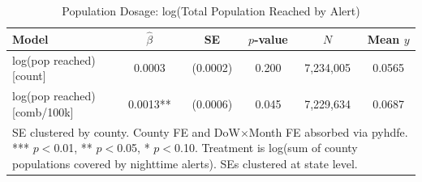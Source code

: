 \begin{table}[htbp]\centering
\caption{Population Dosage: log(Total Population Reached by Alert)}
\begin{tabular}{lccccc}
\hline\hline
Model & $\hat\beta$ & SE & $p$-value & $N$ & Mean $y$ \\
\midrule
log(pop reached) [count] & 0.0003 & (0.0002) & 0.200 & 7,234,005 & 0.0565 \\
log(pop reached) [comb/100k] & 0.0013** & (0.0006) & 0.045 & 7,229,634 & 0.0687 \\
\hline\hline
\multicolumn{6}{p{0.9\textwidth}}{\footnotesize SE clustered by county. County FE and DoW$\times$Month FE absorbed via pyhdfe. *** $p{<}$0.01, ** $p{<}$0.05, * $p{<}$0.10. Treatment is log(sum of county populations covered by nighttime alerts). SEs clustered at state level.} \\
\end{tabular}
\end{table}